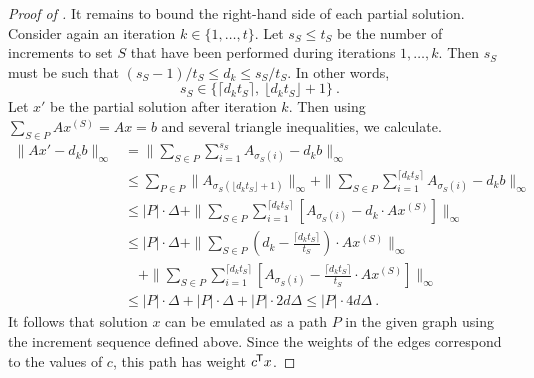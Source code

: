 \documentclass{article}
\newcommand*{\T}{^{\mkern-1.5mu\mathsf{T}}}
\begin{document}
\begin{proof}[Proof of ]
	It remains to bound the right-hand side of each partial solution. Consider again an iteration $k\in\{1,\dotsc,t\}$.
	Let $s_S \le t_S$ be the number of increments to set $S$ that have been performed during iterations $1,\dotsc,k$. Then $s_S$ must be such that $(s_S - 1)/t_S \le d_k \le s_S/t_S$. In other words,
	\begin{equation*}
		s_S \in \{\lceil d_k t_S \rceil,\ \lfloor d_k t_S\rfloor + 1\} \ .
	\end{equation*}
	Let $x'$ be the partial solution after iteration $k$. Then using $\sum_{S\in P} Ax^{(S)} = Ax = b$ and
	several triangle inequalities, we calculate.
	\begin{align*}
		\|A x' - d_k b \|_{\infty} &= \|\sum_{S\in P} \sum_{i=1}^{s_S} A_{\sigma_S(i)} - d_k b\|_{\infty} \\
		&\le \sum_{P\in P} \|A_{\sigma_S(\lfloor d_k t_S \rfloor + 1)} \|_{\infty} + \|\sum_{S\in P} \sum_{i=1}^{\lceil d_k t_S \rceil} A_{\sigma_S(i)} - d_k b\|_{\infty} \\
		&\le |P| \cdot \Delta + \|\sum_{S\in P} \sum_{i=1}^{\lceil d_k t_S \rceil} [A_{\sigma_S(i)} - d_k \cdot Ax^{(S)}]\|_{\infty} \\
		&\le |P| \cdot \Delta + \|\sum_{S\in P} (d_k - \frac{\lceil d_k t_S \rceil}{t_S}) \cdot Ax^{(S)}\|_{\infty} \\
		&\quad + \|\sum_{S\in P} \sum_{i=1}^{\lceil d_k t_S \rceil} [A_{\sigma_S(i)} - \frac{\lceil d_k t_S \rceil}{t_S} \cdot Ax^{(S)}]\|_{\infty} \\
		&\le |P| \cdot \Delta + |P|\cdot \Delta + |P| \cdot 2d\Delta \le |P| \cdot 4d\Delta \ .
	\end{align*}
	It follows that solution $x$ can be emulated as a path $P$ in the given graph using the increment sequence
	defined above. Since the weights of the edges correspond to the values of $c$, this path has weight $c\T x$.
\end{proof}
\end{document}

